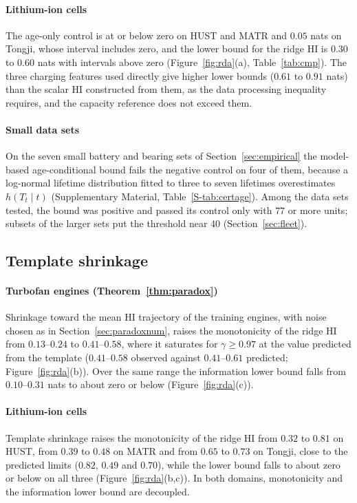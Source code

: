 \documentclass[preprint,12pt]{elsarticle}
\theoremstyle{definition}
\begin{document}
\paragraph{Lithium-ion cells} The age-only control is at or below zero on HUST and MATR and $0.05$ nats on Tongji, whose interval includes zero, and the lower bound for the ridge HI is $0.30$ to $0.60$ nats with intervals above zero (Figure~\ref{fig:rda}(a), Table~\ref{tab:cmp}). The three charging features used directly give higher lower bounds ($0.61$ to $0.91$ nats) than the scalar HI constructed from them, as the data processing inequality requires, and the capacity reference does not exceed them.

\paragraph{Small data sets} On the seven small battery and bearing sets of Section~\ref{sec:empirical} the model-based age-conditional bound fails the negative control on four of them, because a log-normal lifetime distribution fitted to three to seven lifetimes overestimates $h(T_t\mid t)$ (Supplementary Material, Table~\ref{S-tab:certage}). Among the data sets tested, the bound was positive and passed its control only with $77$ or more units; subsets of the larger sets put the threshold near $40$ (Section~\ref{sec:fleet}).

\subsection{Template shrinkage}
\paragraph{Turbofan engines (Theorem~\ref{thm:paradox})} Shrinkage toward the mean HI trajectory of the training engines, with noise chosen as in Section~\ref{sec:paradoxnum}, raises the monotonicity of the ridge HI from $0.13$--$0.24$ to $0.41$--$0.58$, where it saturates for $\gamma\ge0.97$ at the value predicted from the template ($0.41$--$0.58$ observed against $0.41$--$0.61$ predicted; Figure~\ref{fig:rda}(b)). Over the same range the information lower bound falls from $0.10$--$0.31$ nats to about zero or below (Figure~\ref{fig:rda}(c)).

\paragraph{Lithium-ion cells} Template shrinkage raises the monotonicity of the ridge HI from $0.32$ to $0.81$ on HUST, from $0.39$ to $0.48$ on MATR and from $0.65$ to $0.73$ on Tongji, close to the predicted limits ($0.82$, $0.49$ and $0.70$), while the lower bound falls to about zero or below on all three (Figure~\ref{fig:rda}(b,c)). In both domains, monotonicity and the information lower bound are decoupled.
\end{document}

